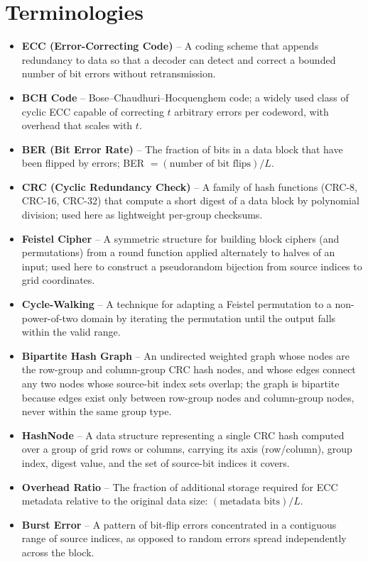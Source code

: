 \chapter*{Terminologies}
\begin{itemize}
    \item \textbf{ECC (Error-Correcting Code)} -- A coding scheme that appends redundancy to data so that a decoder can detect and correct a bounded number of bit errors without retransmission.
    \item \textbf{BCH Code} -- Bose--Chaudhuri--Hocquenghem code; a widely used class of cyclic ECC capable of correcting $t$ arbitrary errors per codeword, with overhead that scales with $t$.
    \item \textbf{BER (Bit Error Rate)} -- The fraction of bits in a data block that have been flipped by errors; BER $= (\text{number of bit flips}) / L$.
    \item \textbf{CRC (Cyclic Redundancy Check)} -- A family of hash functions (CRC-8, CRC-16, CRC-32) that compute a short digest of a data block by polynomial division; used here as lightweight per-group checksums.
    \item \textbf{Feistel Cipher} -- A symmetric structure for building block ciphers (and permutations) from a round function applied alternately to halves of an input; used here to construct a pseudorandom bijection from source indices to grid coordinates.
    \item \textbf{Cycle-Walking} -- A technique for adapting a Feistel permutation to a non-power-of-two domain by iterating the permutation until the output falls within the valid range.
    \item \textbf{Bipartite Hash Graph} -- An undirected weighted graph whose nodes are the row-group and column-group CRC hash nodes, and whose edges connect any two nodes whose source-bit index sets overlap; the graph is bipartite because edges exist only between row-group nodes and column-group nodes, never within the same group type.
    \item \textbf{HashNode} -- A data structure representing a single CRC hash computed over a group of grid rows or columns, carrying its axis (row/column), group index, digest value, and the set of source-bit indices it covers.
    \item \textbf{Overhead Ratio} -- The fraction of additional storage required for ECC metadata relative to the original data size: $(\text{metadata bits}) / L$.
    \item \textbf{Burst Error} -- A pattern of bit-flip errors concentrated in a contiguous range of source indices, as opposed to random errors spread independently across the block.

\end{itemize}
